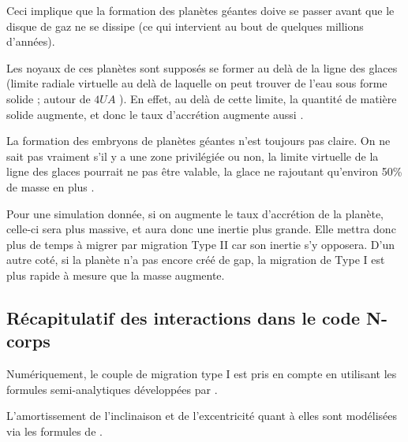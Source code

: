 Ceci implique que la formation des planètes géantes doive se passer avant que le disque de gaz ne se dissipe (ce qui intervient au bout de quelques millions d'années).

Les noyaux de ces planètes sont supposés se former au delà de la ligne des glaces (limite radiale virtuelle au delà de laquelle on peut trouver de l'eau sous forme solide ; autour de $4\unit{UA}$ \citep{martin2013evolution}). En effet, au delà de cette limite, la quantité de matière solide augmente, et donc le taux d'accrétion augmente aussi \citep{sasselov2000snowline}.

La formation des embryons de planètes géantes n'est toujours pas claire. On ne sait pas vraiment s'il y a une zone privilégiée ou non, la limite virtuelle de la ligne des glaces pourrait ne pas être valable, la glace ne rajoutant qu'environ 50\% de masse en plus \citep{lodders2003solar}.


\bigskip

Pour une simulation donnée, si on augmente le taux d'accrétion de la planète, celle-ci sera plus massive, et aura donc une inertie plus grande. Elle mettra donc plus de temps à migrer par migration Type II car son inertie s'y opposera. D'un autre coté, si la planète n'a pas encore créé de gap, la migration de Type I est plus rapide à mesure que la masse augmente. 

\subsection{Récapitulatif des interactions dans le code N-corps}
Numériquement, le couple de migration type I est pris en compte en utilisant les formules semi-analytiques développées par \cite{paardekooper2011torque}. 

L'amortissement de l'inclinaison et de l'excentricité quant à elles sont modélisées via les formules de \cite{cresswell2008three}.

